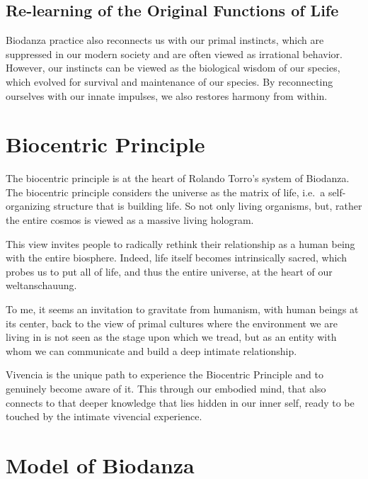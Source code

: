 \documentclass[
  11pt,
]{book}
\begin{document}
\hypertarget{re-learning-of-the-original-functions-of-life}{%
\subsection{Re-learning of the Original Functions of Life}\label{re-learning-of-the-original-functions-of-life}}

Biodanza practice also reconnects us with our primal instincts, which are suppressed in our modern society and are often viewed as irrational behavior.
However, our instincts can be viewed as the biological wisdom of our species, which evolved for survival and maintenance of our species. By reconnecting ourselves with our innate impulses, we also restores harmony from within.

\hypertarget{sectionBiocentricPrinciple}{%
\section{Biocentric Principle}\label{sectionBiocentricPrinciple}}

The biocentric principle is at the heart of Rolando Torro's system of Biodanza. The biocentric principle considers the universe as the matrix of life, i.e.~a self-organizing structure that is building life. So not only living organisms, but, rather the entire cosmos is viewed as a massive living hologram.

This view invites people to radically rethink their relationship as a human being with the entire biosphere. Indeed, life itself becomes intrinsically sacred, which probes us to put all of life, and thus the entire universe, at the heart of our weltanschauung.

To me, it seems an invitation to gravitate from humanism, with human beings at its center, back to the view of primal cultures where the environment we are living in is not seen as the stage upon which we tread, but as an entity with whom we can communicate and build a deep intimate relationship.

Vivencia is the unique path to experience the Biocentric Principle and to genuinely become aware of it. This through our embodied mind, that also connects to that deeper knowledge that lies hidden in our inner self, ready to be touched by the intimate vivencial experience.

\hypertarget{sectionModelOfBiodanza}{%
\section{Model of Biodanza}\label{sectionModelOfBiodanza}}
\end{document}
